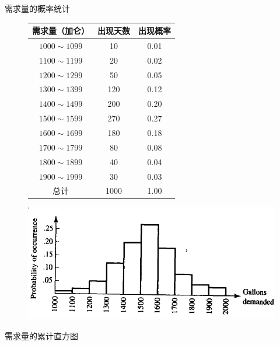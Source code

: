 \documentclass[UTF8]{ctexbeamer}
\begin{document}
\begin{frame}{需求量的概率统计}
  \begin{figure}
    \begin{tabular}{ccc}
      \hline\hline
      需求量（加仑） & 出现天数 & 出现概率\\
      \hline
      $1000 \sim 1099$ & 10 & 0.01\\
      $1100 \sim 1199$ & 20 & 0.02\\
      $1200 \sim 1299$ & 50 & 0.05\\
      $1300 \sim 1399$ & 120 & 0.12\\
      $1400 \sim 1499$ & 200 & 0.20\\
      $1500 \sim 1599$ & 270 & 0.27\\
      $1600 \sim 1699$ & 180 & 0.18\\
      $1700 \sim 1799$ & 80 & 0.08\\
      $1800 \sim 1899$ & 40 & 0.04\\
      $1900 \sim 1999$ & 30 & 0.03\\
      \hline
      总计 & 1000 & 1.00
    \end{tabular}
    \includegraphics[width=.4\textwidth{}]{gas-freq.png}
  \end{figure}
\end{frame}

\begin{frame}{需求量的累计直方图}
  \begin{figure}
    \setcounter{subfigure}{0}{}
  \end{figure}
\end{frame}
\end{document}
